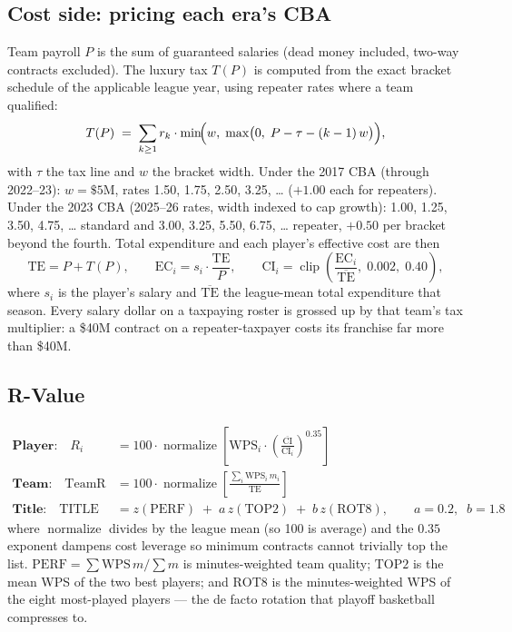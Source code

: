 \documentclass[11pt]{article}
\begin{document}
\subsection{Cost side: pricing each era's CBA}
Team payroll $P$ is the sum of guaranteed salaries (dead money included,
two-way contracts excluded). The luxury tax $T(P)$ is computed from the exact
bracket schedule of the applicable league year, using repeater rates where a
team qualified:
\begin{equation}
T(P) \;=\; \sum_{k\ge 1} r_k \cdot
  \min\!\Bigl(w,\; \max\bigl(0,\; P - \tau - (k-1)\,w\bigr)\Bigr),
\end{equation}
with $\tau$ the tax line and $w$ the bracket width. Under the 2017 CBA
(through 2022--23): $w = \$5$M, rates 1.50, 1.75, 2.50, 3.25, \ldots{}
($+1.00$ each for repeaters). Under the 2023 CBA (2025--26 rates, width
indexed to cap growth): 1.00, 1.25, 3.50, 4.75, \ldots{} standard and 3.00,
3.25, 5.50, 6.75, \ldots{} repeater, $+0.50$ per bracket beyond the fourth.
Total expenditure and each player's effective cost are then
\begin{equation}
\mathrm{TE} = P + T(P), \qquad
\mathrm{EC}_i = s_i \cdot \frac{\mathrm{TE}}{P}, \qquad
\mathrm{CI}_i = \operatorname{clip}\!\left(
  \frac{\mathrm{EC}_i}{\overline{\mathrm{TE}}},\; 0.002,\; 0.40\right),
\end{equation}
where $s_i$ is the player's salary and $\overline{\mathrm{TE}}$ the league-mean
total expenditure that season. Every salary dollar on a taxpaying roster is
grossed up by that team's tax multiplier: a \$40M contract on a
repeater-taxpayer costs its franchise far more than \$40M.

\subsection{R-Value}
\begin{align}
\textbf{Player:}\quad
R_i &= 100 \cdot \operatorname{normalize}\!\left[
  \mathrm{WPS}_i \cdot \left(\frac{\overline{\mathrm{CI}}}{\mathrm{CI}_i}\right)^{0.35}
  \right] \\[4pt]
\textbf{Team:}\quad
\mathrm{TeamR} &= 100 \cdot \operatorname{normalize}\!\left[
  \frac{\sum_i \mathrm{WPS}_i\, m_i}{\mathrm{TE}} \right] \\[4pt]
\textbf{Title:}\quad
\mathrm{TITLE} &= z(\mathrm{PERF}) \;+\; a\, z(\mathrm{TOP2})
  \;+\; b\, z(\mathrm{ROT8}), \qquad a = 0.2,\;\; b = 1.8
\end{align}
where $\operatorname{normalize}$ divides by the league mean (so 100 is
average) and the $0.35$ exponent dampens cost leverage so minimum contracts
cannot trivially top the list.
$\mathrm{PERF} = \sum \mathrm{WPS}\,m / \sum m$ is minutes-weighted team
quality; $\mathrm{TOP2}$ is the mean WPS of the two best players; and
$\mathrm{ROT8}$ is the minutes-weighted WPS of the eight most-played
players --- the de facto rotation that playoff basketball compresses to.
\end{document}
